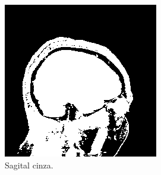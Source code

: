 \documentclass{article}
\begin{document}
\begin{figure}[H]
    \centering
    \begin{subfigure}[b]{0.3\textwidth}
        \includegraphics[width=\textwidth]{brain/_neuroradiologist-sagital-gray.png}
        \caption{Sagital cinza.}
    \end{subfigure}
    ~
    \begin{subfigure}[b]{0.3\textwidth}

\end{subfigure}
\end{figure}
\end{document}
